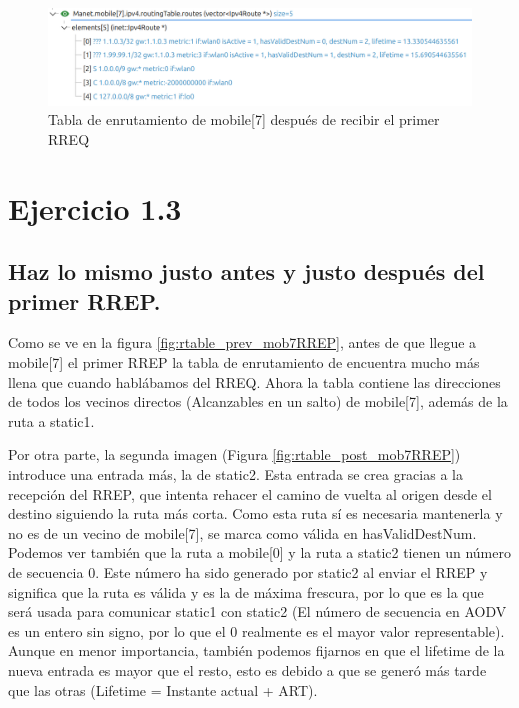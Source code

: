 \begin{figure}[H]
    \centering
    \includegraphics[width=125mm, scale=0.75]{imaxes/aodv/ejercicio2_2.png}
    \caption{Tabla de enrutamiento de mobile[7] después de recibir el primer RREQ}
    \label{fig:rtable_post_mob7}
\end{figure}

\vspace{1.25cm}
\section{Ejercicio 1.3}

\subsection{Haz lo mismo justo antes y justo después del primer RREP.}

Como se ve en la figura \ref{fig:rtable_prev_mob7RREP}, antes de que llegue a mobile[7] el primer RREP la tabla de enrutamiento de encuentra mucho más llena que cuando hablábamos del RREQ. Ahora la tabla contiene las direcciones de todos los vecinos directos (Alcanzables en un salto) de mobile[7], además de la ruta a static1.

Por otra parte, la segunda imagen (Figura \ref{fig:rtable_post_mob7RREP}) introduce una entrada más, la de static2. Esta entrada se crea gracias a la recepción del RREP, que intenta rehacer el camino de vuelta al origen desde el destino siguiendo la ruta más corta. Como esta ruta sí es necesaria mantenerla y no es de un vecino de mobile[7], se marca como válida en hasValidDestNum. Podemos ver también que la ruta a mobile[0] y la ruta a static2 tienen un número de secuencia 0. Este número ha sido generado por static2 al enviar el RREP y significa que la ruta es válida y es la de máxima frescura, por lo que es la que será usada para comunicar static1 con static2 (El número de secuencia en AODV es un entero sin signo, por lo que el 0 realmente es el mayor valor representable). Aunque en menor importancia, también podemos fijarnos en que el lifetime de la nueva entrada es mayor que el resto, esto es debido a que se generó más tarde que las otras (Lifetime = Instante actual + ART).

